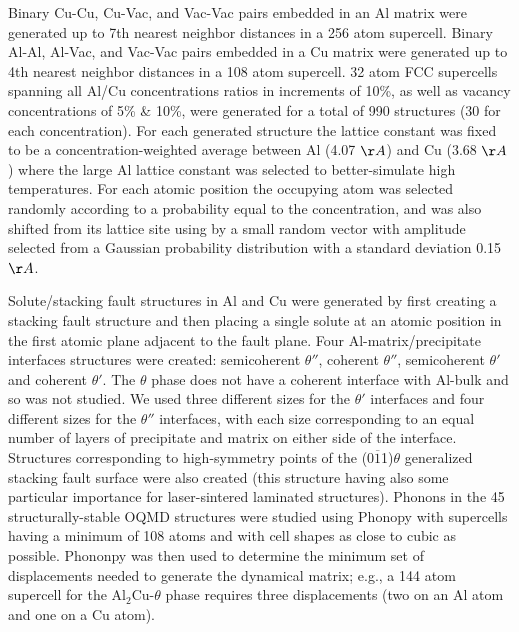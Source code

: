 \documentclass{article}
\begin{document}
Binary Cu-Cu, Cu-Vac, and Vac-Vac pairs embedded in an Al matrix were generated up to 7th nearest neighbor distances in a 256 atom supercell. 
Binary Al-Al, Al-Vac, and Vac-Vac pairs embedded in a Cu matrix were generated up to 4th nearest neighbor distances in a 108 atom supercell. 
32 atom FCC supercells spanning all Al/Cu concentrations ratios in increments of 10\%, as well as vacancy concentrations of 5\% \& 10\%, were generated for a total of 990 structures (30 for each concentration).
For each generated structure the lattice constant was fixed to be a concentration-weighted average between Al (4.07 $\AA$) and Cu (3.68 $\AA$) where the large Al lattice constant was selected to better-simulate high temperatures. For each atomic position the occupying atom was selected randomly according to a probability equal to the concentration, and was also shifted from its lattice site using by a small random vector with amplitude selected from a Gaussian probability distribution with a standard deviation 0.15$\AA$.

Solute/stacking fault structures in Al and Cu were generated by first creating a stacking fault structure and then placing a single solute at an atomic position in the first atomic plane adjacent to the fault plane.
Four Al-matrix/precipitate interfaces structures were created: semicoherent $\theta''$, coherent $\theta''$,
semicoherent $\theta'$ and coherent $\theta'$. The $\theta$ phase does not have a coherent interface\cite{Nie2014PhysicalAlloys} with Al-bulk and so was not studied.
We used three different sizes for the $\theta'$ interfaces and four different sizes for the $\theta''$ interfaces, with each size corresponding to an equal number of layers of precipitate and matrix on either side of the interface. 
Structures corresponding to high-symmetry points of the (0$\overline{1}$1)$\theta$ generalized stacking fault surface were also created (this structure having also some particular importance for laser-sintered laminated structures\cite{Wang2018}).
Phonons in the 45 structurally-stable OQMD structures were studied using Phonopy\cite{Togo2015FirstScience} with supercells having a minimum of 108 atoms and with cell shapes as close to cubic as possible.
Phononpy was then used to determine the minimum set of displacements needed to generate the dynamical matrix; e.g., a 144 atom supercell for the Al$_2$Cu-$\theta$ phase requires three displacements (two on an Al atom and one on a Cu atom).
\end{document}
